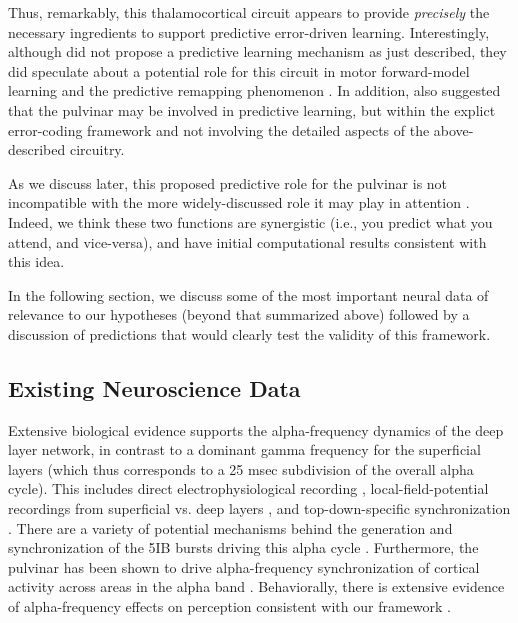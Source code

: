 \documentclass[11pt,twoside]{article}
\newif\myifpdf
\begin{document}
\begin{itemize}
\end{itemize}

Thus, remarkably, this thalamocortical circuit appears to provide \emph{precisely} the necessary ingredients to support predictive error-driven learning.  Interestingly, although  did not propose a predictive learning mechanism as just described, they did speculate about a potential role for this circuit in motor forward-model learning and the predictive remapping phenomenon \cite{ShermanGuillery11,UsreySherman18}.  In addition,  also suggested that the pulvinar may be involved in predictive learning, but within the explict error-coding framework and not involving the detailed aspects of the above-described circuitry.

As we discuss later, this proposed predictive role for the pulvinar is not incompatible with the more widely-discussed role it may play in attention \cite{LaBergeBuchsbaum90,BenderYouakim01,SnowAllenRafalEtAl09,SaalmannKastner11,ZhouSchaferDesimone16,FiebelkornKastner19}.  Indeed, we think these two functions are synergistic (i.e., you predict what you attend, and vice-versa), and have initial computational results consistent with this idea.

In the following section, we discuss some of the most important neural data of relevance to our hypotheses (beyond that summarized above) followed by a discussion of predictions that would clearly test the validity of this framework.

\subsection{Existing Neuroscience Data}

Extensive biological evidence supports the alpha-frequency dynamics of the deep layer network, in contrast to a dominant gamma frequency for the superficial layers (which thus corresponds to a 25 msec subdivision of the overall alpha cycle).  This includes direct electrophysiological recording \cite{LuczakBarthoHarris13}, local-field-potential recordings from superficial vs. deep layers \cite{BuffaloFriesLandmanEtAl11,MaierAdamsAuraEtAl10,MaierAuraLeopold11,SpaakBonnefondMaierEtAl12,XingYehBurnsEtAl12,BastosVezoliBosmanEtAl15,MichalareasVezolivanPeltEtAl16}, and top-down-specific synchronization \cite{vonSteinChiangKonig00,vanKerkoerleSelfDagninoEtAl14}. There are a variety of potential mechanisms behind the generation and synchronization of the 5IB bursts driving this alpha cycle \cite{ConnorsGutnickPrince82,LopesdaSilva91,LorinczKekesiJuhaszEtAl09,FranceschettiGuatteoPanzicaEtAl95,SaalmannPinskWangEtAl12}.  Furthermore, the pulvinar has been shown to drive alpha-frequency synchronization of cortical activity across areas in the alpha band \cite{SaalmannPinskWangEtAl12}.  Behaviorally, there is extensive evidence of alpha-frequency effects on perception consistent with our framework \cite{NunnOsselton74,VarelaToroJohnEtAl81,VanRullenKoch03,JensenBonnefondVanRullen12}.
\end{document}
